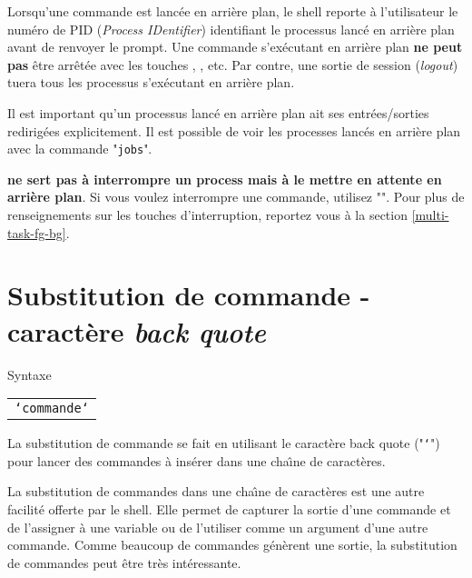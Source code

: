 Lorsqu'une commande est lanc{\'e}e en arri{\`e}re plan, le shell reporte
{\`a} l'utilisateur le num{\'e}ro de PID ({\sl Process IDentifier}) identifiant le processus
lanc{\'e} en arri{\`e}re plan avant de renvoyer le prompt. Une commande
s'ex{\'e}cutant en arri{\`e}re plan \textbf{ne peut pas} {\^e}tre
arr{\^e}t{\'e}e avec les touches , , etc.
Par contre, une sortie de session (\textsl{logout}) tuera tous les
processus s'ex{\'e}cutant en arri{\`e}re plan.

Il est important qu'un processus lanc{\'e} en arri{\`e}re plan ait ses
entr{\'e}es/sorties redirig{\'e}es explicitement. Il est possible de
voir les processes lanc{\'e}s en arri{\`e}re plan avec la commande
 "\texttt{jobs}".
 
\begin{remarque}
 {\bf ne sert pas {\`a} interrompre un process mais {\`a} le mettre
en attente en arri{\`e}re plan}. Si vous voulez interrompre une commande,
utilisez "". Pour plus de renseignements sur les touches
d'interruption, reportez vous {\`a} la section \ref{multi-task-fg-bg}.
\end{remarque}

\section{\label{multi-task-backq}Substitution de commande - caract{\`e}re {\sl back quote}}

\begin{definition}{Syntaxe}
\begin{tabular}{@{\hspace{1cm}}l}
	{\tt `commande`}\\[0.2cm]
\end{tabular}
\end{definition}

La substitution de commande se fait en utilisant le caract{\`e}re back quote
("\texttt{`}") pour lancer des commandes {\`a} ins{\'e}rer dans une cha{\^\i}ne de
caract{\`e}res.

La substitution de commandes dans une cha{\^\i}ne de caract{\`e}res est une autre
facilit{\'e} offerte par le shell. Elle permet de capturer la sortie d'une
commande et de l'assigner {\`a} une variable ou de l'utiliser comme un
argument d'une autre commande. Comme beaucoup de commandes {\Unix}
g{\'e}n{\`e}rent une sortie, la substitution de commandes peut {\^e}tre tr{\`e}s
int{\'e}ressante.

